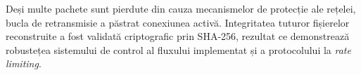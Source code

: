 Deși multe pachete sunt pierdute din cauza mecanismelor de protecție ale rețelei, bucla de retransmisie a păstrat conexiunea activă. Integritatea tuturor fișierelor reconstruite a fost validată criptografic prin SHA-256, rezultat ce demonstrează robustețea sistemului de control al fluxului implementat și a protocolului la \textit{rate limiting}.